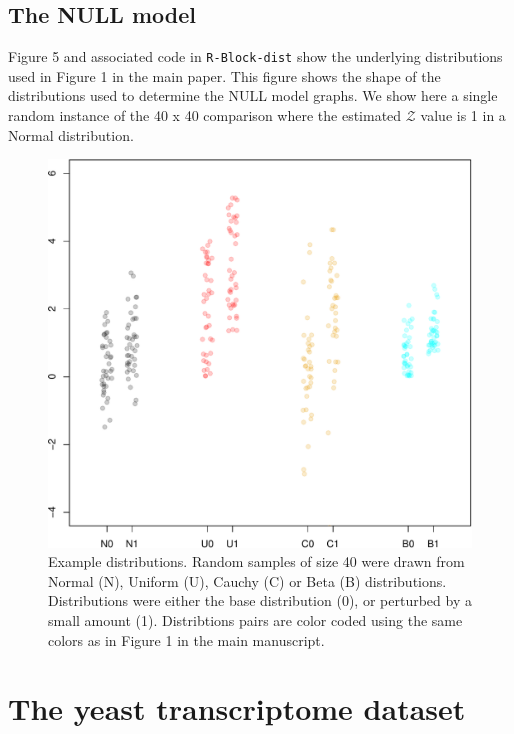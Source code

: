 \documentclass[onecolumn]{article}
\begin{document}
\clearpage

\hypertarget{the-null-model}{%
\subsection{The NULL model}\label{the-null-model}}

Figure 5 and associated code in \texttt{R-Block-dist} show the
underlying distributions used in Figure 1 in the main paper. This figure
shows the shape of the distributions used to determine the NULL model
graphs. We show here a single random instance of the 40 x 40 comparison
where the estimated \(\mathcal{Z}\) value is 1 in a Normal distribution.

\begin{figure}
\centering
\includegraphics{effect_supplement_files/figure-latex/R-Block-dist-1.pdf}
\caption{Example distributions. Random samples of size 40 were drawn
from Normal (N), Uniform (U), Cauchy (C) or Beta (B) distributions.
Distributions were either the base distribution (0), or perturbed by a
small amount (1). Distribtions pairs are color coded using the same
colors as in Figure 1 in the main manuscript.}
\end{figure}

\clearpage

\hypertarget{the-yeast-transcriptome-dataset}{%
\section{The yeast transcriptome
dataset}\label{the-yeast-transcriptome-dataset}}
\end{document}
